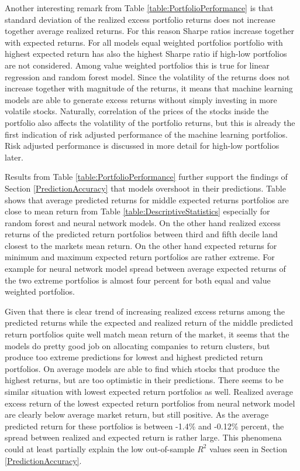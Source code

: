\documentclass{article}
\begin{document}
Another interesting remark from Table \ref{table:PortfolioPerformance} is that standard deviation of the realized excess portfolio returns does not increase together average realized returns. For this reason Sharpe ratios increase together with expected returns. For all models equal weighted portfolios portfolio with highest expected return has also the highest Sharpe ratio if high-low portfolios are not considered. Among value weighted portfolios this is true for linear regression and random forest model. Since the volatility of the returns does not increase together with magnitude of the returns, it means that machine learning models are able to generate excess returns without simply investing in more volatile stocks. Naturally, correlation of the prices of the stocks inside the portfolio also affects the volatility of the portfolio returns, but this is already the first indication of risk adjusted performance of the machine learning portfolios. Risk adjusted performance is discussed in more detail for high-low portfolios later. \par

Results from Table \ref{table:PortfolioPerformance} further support the findings of Section \ref{PredictionAccuracy} that models overshoot in their predictions. Table shows that average predicted returns for middle expected returns portfolios are close to mean return from Table \ref{table:DescriptiveStatistics} especially for random forest and neural network models. On the other hand realized excess returns of the predicted return portfolios between third and fifth decile land closest to the markets mean return. On the other hand expected returns for minimum and maximum expected return portfolios are rather extreme. For example for neural network model spread between average expected returns of the two extreme portfolios is almost four percent for both equal and value weighted portfolios. \par

Given that there is clear trend of increasing realized excess returns among the predicted returns while the expected and realized return of the middle predicted return portfolios quite well match mean return of the market, it seems that the models do pretty good job on allocating companies to return clusters, but produce too extreme predictions for lowest and highest predicted return portfolios. On average models are able to find which stocks that produce the highest returns, but are too optimistic in their predictions. There seems to be similar situation with lowest expected return portfolios as well. Realized average excess return of the lowest expected return portfolios from neural network model are clearly below average market return, but still positive. As the average predicted return for these portfolios is between -1.4\% and -0.12\% percent, the spread between realized and expected return is rather large. This phenomena could at least partially explain the low out-of-sample $R^2$ values seen in Section \ref{PredictionAccuracy}. \par  
\end{document}
